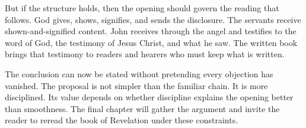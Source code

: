 But if the structure holds, then the opening should govern the reading that follows. God gives, shows, signifies, and sends the disclosure. The servants receive shown-and-signified content. John receives through the angel and testifies to the word of God, the testimony of Jesus Christ, and what he saw. The written book brings that testimony to readers and hearers who must keep what is written.

The conclusion can now be stated without pretending every objection has vanished. The proposal is not simpler than the familiar chain. It is more disciplined. Its value depends on whether discipline explains the opening better than smoothness. The final chapter will gather the argument and invite the reader to reread the book of Revelation under these constraints.
